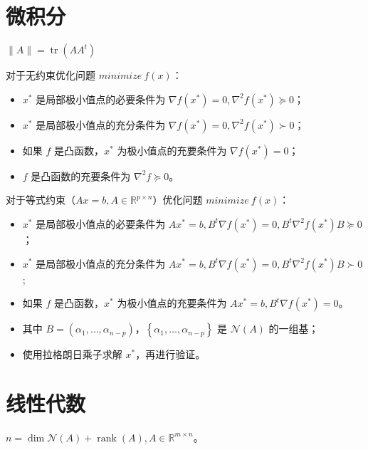 


\newcommand\Title{智能计算数学基础笔记}
\renewcommand\due{due: November 6, 2022}
\newcommand\tr{\operatorname{tr}}





\section{微积分}
\begin{remark}
	$\|A\| = \tr{(AA^t)}$
\end{remark}
\begin{remark}
	对于无约束优化问题 $minimize\ f(x)$：
	\begin{itemize}
		\item $x^*$ 是局部极小值点的必要条件为 $\nabla f(x^*) = 0, \nabla^2f(x^*)\succeq 0$；
		\item $x^*$ 是局部极小值点的充分条件为 $\nabla f(x^*) = 0, \nabla^2f(x^*)\succ 0$；
		\item 如果 $f$ 是凸函数，$x^*$ 为极小值点的充要条件为 $\nabla f(x^*) = 0$；
		\item $f$ 是凸函数的充要条件为 $\nabla^2f\succeq 0$。
	\end{itemize}
\end{remark}

\begin{remark}
	对于等式约束（$Ax=b, A\in \mathbb{R}^{p\times n}$）优化问题 $minimize\ f(x)$：
	\begin{itemize}
		\item $x^*$ 是局部极小值点的必要条件为 $Ax^*=b, B^t\nabla f(x^*) = 0, B^t\nabla^2f(x^*)B \succeq 0$；
		\item $x^*$ 是局部极小值点的充分条件为 $Ax^*=b, B^t\nabla f(x^*) = 0, B^t\nabla^2f(x^*)B \succ 0$;
		\item 如果 $f$ 是凸函数，$x^*$ 为极小值点的充要条件为 $Ax^*=b, B^t\nabla f(x^*) = 0$。
		\item 其中 $B=(\alpha_1, \dots, \alpha_{n - p})$，$\left\{\alpha_1, \dots, \alpha_{n - p}\right\}$ 是 $\mathcal{N}(A)$ 的一组基；
		\item 使用拉格朗日乘子求解 $x^*$，再进行验证。
	\end{itemize}
\end{remark}

\section{线性代数}
\begin{remark}
	$n = \dim \mathcal{N}(A) + \operatorname{rank}(A), A\in \mathbb{R}^{m\times n}$。
\end{remark}

